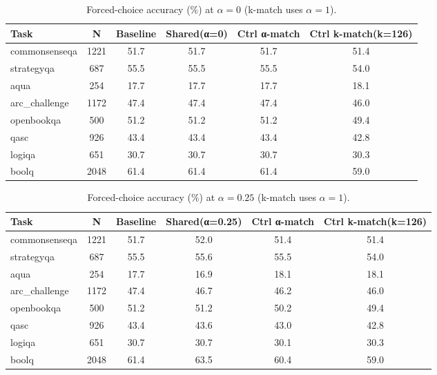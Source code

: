 \begin{table}[t]
\centering
\caption{Forced-choice accuracy (\%) at $\alpha=0$ (k-match uses $\alpha=1$).}
\label{tab:energy_kmatch_alpha_0}
\begin{tabular}{lccccc}
\hline
Task & N & Baseline & Shared(α=0) & Ctrl α-match & Ctrl k-match(k=126) \\
\hline
commonsenseqa & 1221 & 51.7 & 51.7 & 51.7 & 51.4 \\
strategyqa & 687 & 55.5 & 55.5 & 55.5 & 54.0 \\
aqua & 254 & 17.7 & 17.7 & 17.7 & 18.1 \\
arc\_challenge & 1172 & 47.4 & 47.4 & 47.4 & 46.0 \\
openbookqa & 500 & 51.2 & 51.2 & 51.2 & 49.4 \\
qasc & 926 & 43.4 & 43.4 & 43.4 & 42.8 \\
logiqa & 651 & 30.7 & 30.7 & 30.7 & 30.3 \\
boolq & 2048 & 61.4 & 61.4 & 61.4 & 59.0 \\
\hline
\end{tabular}
\end{table}

\begin{table}[t]
\centering
\caption{Forced-choice accuracy (\%) at $\alpha=0.25$ (k-match uses $\alpha=1$).}
\label{tab:energy_kmatch_alpha_0_25}
\begin{tabular}{lccccc}
\hline
Task & N & Baseline & Shared(α=0.25) & Ctrl α-match & Ctrl k-match(k=126) \\
\hline
commonsenseqa & 1221 & 51.7 & 52.0 & 51.4 & 51.4 \\
strategyqa & 687 & 55.5 & 55.6 & 55.5 & 54.0 \\
aqua & 254 & 17.7 & 16.9 & 18.1 & 18.1 \\
arc\_challenge & 1172 & 47.4 & 46.7 & 46.2 & 46.0 \\
openbookqa & 500 & 51.2 & 51.2 & 50.2 & 49.4 \\
qasc & 926 & 43.4 & 43.6 & 43.0 & 42.8 \\
logiqa & 651 & 30.7 & 30.7 & 30.1 & 30.3 \\
boolq & 2048 & 61.4 & 63.5 & 60.4 & 59.0 \\
\hline
\end{tabular}
\end{table}

